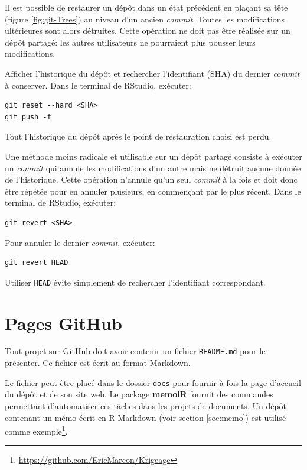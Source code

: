 \documentclass[
  12pt,
  french,
  a4paper,
  extrafontsizes,onecolumn,openright
  ]{memoir}
\begin{document}
Il est possible de restaurer un dépôt dans un état précédent en plaçant sa tête (figure \ref{fig:git-Trees}) au niveau d'un ancien \emph{commit}.
Toutes les modifications ultérieures sont alors détruites.
Cette opération ne doit pas être réalisée sur un dépôt partagé: les autres utilisateurs ne pourraient plus pousser leurs modifications.

Afficher l'historique du dépôt et rechercher l'identifiant (SHA) du dernier \emph{commit} à conserver.
Dans le terminal de RStudio, exécuter:

\begin{verbatim}
git reset --hard <SHA>
git push -f
\end{verbatim}

Tout l'historique du dépôt après le point de restauration choisi est perdu.

Une méthode moins radicale et utilisable sur un dépôt partagé consiste à exécuter un \emph{commit} qui annule les modifications d'un autre mais ne détruit aucune donnée de l'historique.
Cette opération n'annule qu'un seul \emph{commit} à la fois et doit donc être répétée pour en annuler plusieurs, en commençant par le plus récent.
Dans le terminal de RStudio, exécuter:

\begin{verbatim}
git revert <SHA>
\end{verbatim}

Pour annuler le dernier \emph{commit}, exécuter:

\begin{verbatim}
git revert HEAD
\end{verbatim}

Utiliser \texttt{HEAD} évite simplement de rechercher l'identifiant correspondant.

\hypertarget{sec:github-pages}{%
\section{Pages GitHub}\label{sec:github-pages}}

Tout projet sur GitHub doit avoir contenir un fichier \texttt{README.md} pour le présenter.
Ce fichier est écrit au format Markdown.

Le fichier peut être placé dans le dossier \texttt{docs} pour fournir à fois la page d'accueil du dépôt et de son site web.
Le package \textbf{memoiR} fournit des commandes permettant d'automatiser ces tâches dans les projets de documents.
Un dépôt contenant un mémo écrit en R Markdown (voir section \ref{sec:memo}) est utilisé comme exemple\footnote{\url{https://github.com/EricMarcon/Krigeage}}.
\end{document}
